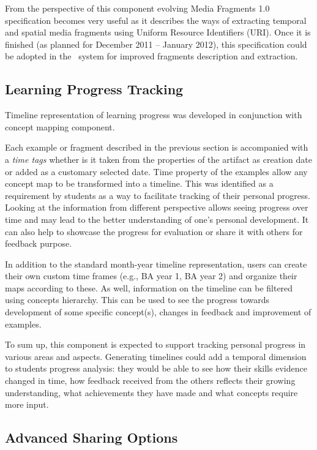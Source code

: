 From the perspective of this component evolving Media Fragments 1.0
specification \citep{MediaGroup2011} becomes very useful as it describes the
ways of extracting temporal and spatial media fragments using Uniform Resource
Identifiers (URI). Once it is finished (as planned for December 2011 -- January
2012), this specification could be adopted in the \ep~system for improved
fragments description and extraction.

\subsection{Learning Progress Tracking}
\label{sec:timeline}

Timeline representation of learning progress was developed in conjunction with
concept mapping component.

Each example or fragment described in the previous section is accompanied with a
\textit{time tags} whether is it taken from the properties of the artifact
as creation date or added as a customary selected date. Time property of the
examples allow any concept map to be transformed into a timeline. This was
identified as a requirement by students as a way to facilitate tracking of their
personal progress. Looking at the information from different perspective allows
seeing progress over time and may lead to the better understanding of one's
personal development. It can also help to showcase the progress for evaluation
or share it with others for feedback purpose.

In addition to the standard month-year timeline representation, users can create
their own custom time frames (e.g., BA year 1, BA year 2) and organize their
maps according to these. As well, information on the timeline can be filtered
using concepts hierarchy. This can be used to see the progress towards
development of some specific concept(s), changes in feedback and improvement of
examples.

To sum up, this component is expected to support tracking personal progress in
various areas and aspects. Generating timelines could add a temporal dimension
to students progress analysis: they would be able to see how their skills evidence
changed in time, how feedback received from the others reflects their growing
understanding, what achievements they have made and what concepts require more
input.

\subsection{Advanced Sharing Options}
\label{sec:sharing}


